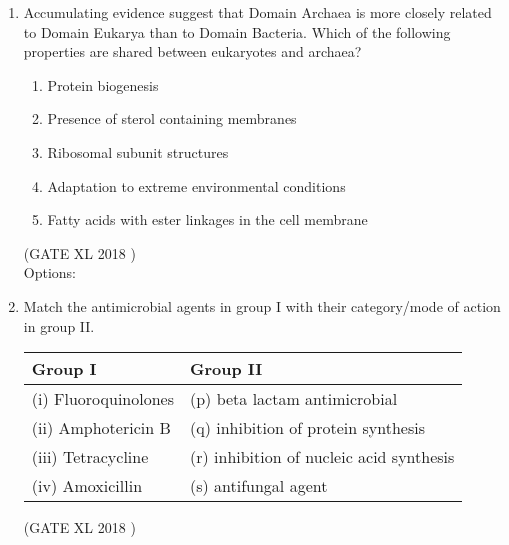 \documentclass[14pt]{extarticle}
\begin{document}
\begin{flushleft}
\begin{enumerate}
\item Accumulating evidence suggest that Domain Archaea is more closely related to Domain Eukarya than to Domain Bacteria. Which of the following properties are shared between eukaryotes and archaea?
\begin{enumerate}
  \item Protein biogenesis
  \item Presence of sterol containing membranes
  \item Ribosomal subunit structures
  \item Adaptation to extreme environmental conditions
  \item Fatty acids with ester linkages in the cell membrane
\end{enumerate}
\hfill(GATE XL 2018 )\\
Options:
\begin{enumerate}
\end{enumerate}

\item Match the antimicrobial agents in group I with their category/mode of action in group II.  

\begin{tabular}{|l|l|}
\hline
\textbf{Group I} & \textbf{Group II} \\ \hline
(i) Fluoroquinolones & (p) beta lactam antimicrobial \\
(ii) Amphotericin B & (q) inhibition of protein synthesis \\
(iii) Tetracycline & (r) inhibition of nucleic acid synthesis \\
(iv) Amoxicillin & (s) antifungal agent \\ \hline
\end{tabular}
\hfill(GATE XL 2018 )\\

\begin{enumerate}
\end{enumerate}


\end{enumerate}
\end{flushleft}
\end{document}
